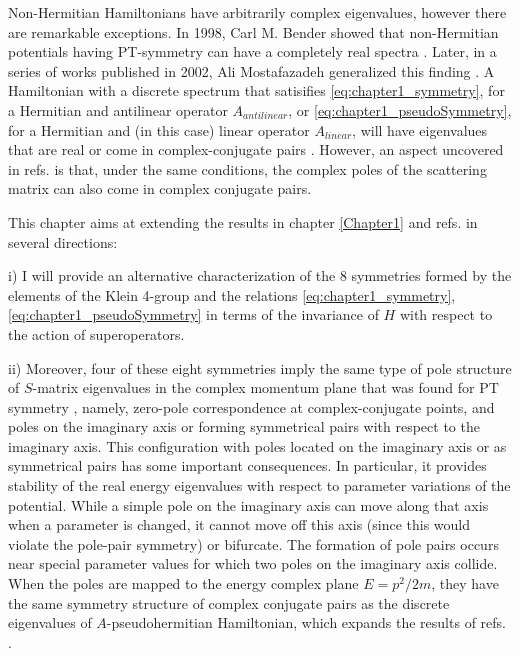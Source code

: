 Non-Hermitian Hamiltonians have arbitrarily complex eigenvalues, however there are remarkable exceptions. In 1998, Carl M. Bender showed that non-Hermitian potentials having PT-symmetry can have a completely real spectra \cite{Bender1998}. Later, in a series of works published in 2002, Ali Mostafazadeh generalized this finding \cite{Mostafazadeh2002,Mostafazadeh2002a,Mostafazadeh2002b}. A Hamiltonian with a discrete spectrum that satisifies \eqref{eq:chapter1_symmetry}, for a Hermitian and antilinear operator $A_{antilinear}$, or \eqref{eq:chapter1_pseudoSymmetry}, for a Hermitian and (in this case) linear operator $A_{linear}$, will have eigenvalues that are real or come in complex-conjugate pairs \cite{Mostafazadeh2002,Mostafazadeh2002a,Mostafazadeh2002b}. However, an aspect uncovered in refs. \cite{Mostafazadeh2002,Mostafazadeh2002a,Mostafazadeh2002b} is that, under the same conditions, the complex poles of the scattering matrix can also come in complex conjugate pairs.

This chapter aims at extending the results in chapter \ref{Chapter1} and refs. \cite{Mostafazadeh2002,Mostafazadeh2002a,Mostafazadeh2002b} in several directions:

i) I will provide an alternative characterization of the 8 symmetries formed by the elements of the Klein 4-group and the relations \eqref{eq:chapter1_symmetry}, \eqref{eq:chapter1_pseudoSymmetry} in terms of the invariance of $H$ with respect to the action of superoperators.

ii) Moreover,
four of these eight symmetries imply the same
type of pole structure of $S$-matrix eigenvalues in the complex momentum plane that was found for PT symmetry \cite{Muga2004},
namely, zero-pole correspondence at complex-conjugate points, and poles on the imaginary axis or forming symmetrical pairs with respect to the imaginary
axis. This configuration with poles located on the imaginary  axis or as symmetrical pairs has some important consequences. In particular, it provides stability of the real energy eigenvalues with respect to parameter variations of the potential. While a simple pole on the imaginary axis can move along that axis when a parameter is changed, it cannot move off this axis (since this would violate the pole-pair symmetry) or bifurcate. The formation of pole pairs occurs near special  parameter values for which two poles on the imaginary axis collide. When the poles are mapped to the energy complex plane $E = p^2/2m$, they have the same symmetry structure of complex conjugate pairs as the discrete eigenvalues of $A$-pseudohermitian Hamiltonian, which expands the results of refs. \cite{Mostafazadeh2002,Mostafazadeh2002a,Mostafazadeh2002b}.

